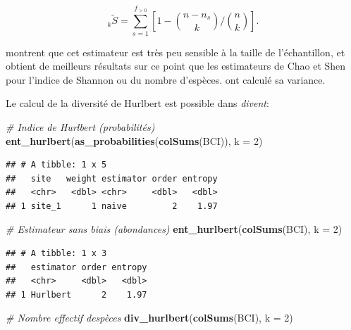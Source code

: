 \documentclass[
  11pt,
  american,
  a4paper,
  extrafontsizes,onecolumn,openright
  ]{memoir}
\newenvironment{Shaded}{\begin{snugshade}}{\end{snugshade}}
\newcommand{\AttributeTok}[1]{\textcolor[rgb]{0.13,0.29,0.53}{#1}}
\newcommand{\CommentTok}[1]{\textcolor[rgb]{0.56,0.35,0.01}{\textit{#1}}}
\newcommand{\DecValTok}[1]{\textcolor[rgb]{0.00,0.00,0.81}{#1}}
\newcommand{\FunctionTok}[1]{\textcolor[rgb]{0.13,0.29,0.53}{\textbf{#1}}}
\newcommand{\NormalTok}[1]{#1}
\begin{document}
\begin{equation}
  \label{eq:EstHurlbert}
  _k{\tilde{S}}
  = \sum_{s=1}^{f_{>0}}{\left[ 1-{\binom{n - n_s}{k}}/{\binom{n}{k}} \right]}.
\end{equation}

\textcite{Dauby2012} montrent que cet estimateur est très peu sensible à la taille de l'échantillon, et obtient de meilleurs résultats sur ce point que les estimateurs de Chao et Shen pour l'indice de Shannon ou du nombre d'espèces.
\textcite{Smith1977} ont calculé sa variance.

Le calcul de la diversité de Hurlbert est possible dans \emph{divent}:

\scriptsize

\begin{Shaded}
\begin{Highlighting}[]
\CommentTok{\# Indice de Hurlbert (probabilités)}
\FunctionTok{ent\_hurlbert}\NormalTok{(}\FunctionTok{as\_probabilities}\NormalTok{(}\FunctionTok{colSums}\NormalTok{(BCI)), }\AttributeTok{k =} \DecValTok{2}\NormalTok{)}
\end{Highlighting}
\end{Shaded}

\begin{verbatim}
## # A tibble: 1 x 5
##   site   weight estimator order entropy
##   <chr>   <dbl> <chr>     <dbl>   <dbl>
## 1 site_1      1 naive         2    1.97
\end{verbatim}

\begin{Shaded}
\begin{Highlighting}[]
\CommentTok{\# Estimateur sans biais (abondances)}
\FunctionTok{ent\_hurlbert}\NormalTok{(}\FunctionTok{colSums}\NormalTok{(BCI), }\AttributeTok{k =} \DecValTok{2}\NormalTok{)}
\end{Highlighting}
\end{Shaded}

\begin{verbatim}
## # A tibble: 1 x 3
##   estimator order entropy
##   <chr>     <dbl>   <dbl>
## 1 Hurlbert      2    1.97
\end{verbatim}

\begin{Shaded}
\begin{Highlighting}[]
\CommentTok{\# Nombre effectif d\textquotesingle{}espèces}
\FunctionTok{div\_hurlbert}\NormalTok{(}\FunctionTok{colSums}\NormalTok{(BCI), }\AttributeTok{k =} \DecValTok{2}\NormalTok{)}
\end{Highlighting}
\end{Shaded}
\end{document}
